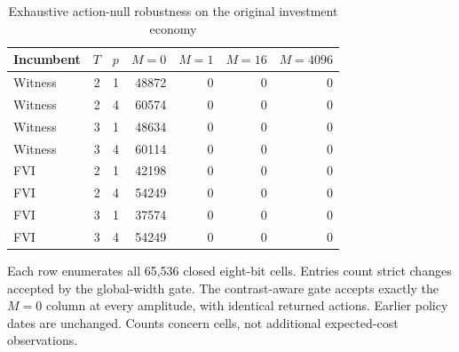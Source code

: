 \begin{table}[htbp]
\caption{Exhaustive action-null robustness on the original investment economy}
\label{tab:robustness52}
\centering\small
\begin{tabular}{lrrrrrr}
\toprule
Incumbent & $T$ & $p$ & $M=0$ & $M=1$ & $M=16$ & $M=4096$ \\
\midrule
Witness & 2 & 1 & 48872 & 0 & 0 & 0 \\
Witness & 2 & 4 & 60574 & 0 & 0 & 0 \\
Witness & 3 & 1 & 48634 & 0 & 0 & 0 \\
Witness & 3 & 4 & 60114 & 0 & 0 & 0 \\
FVI & 2 & 1 & 42198 & 0 & 0 & 0 \\
FVI & 2 & 4 & 54249 & 0 & 0 & 0 \\
FVI & 3 & 1 & 37574 & 0 & 0 & 0 \\
FVI & 3 & 4 & 54249 & 0 & 0 & 0 \\
\bottomrule
\end{tabular}
\parbox{0.96\textwidth}{\footnotesize Each row enumerates all 65,536 closed eight-bit cells. Entries count strict changes accepted by the global-width gate. The contrast-aware gate accepts exactly the $M=0$ column at every amplitude, with identical returned actions. Earlier policy dates are unchanged. Counts concern cells, not additional expected-cost observations.}
\end{table}
